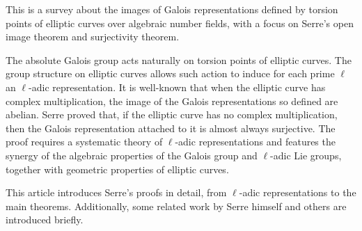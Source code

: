 This is a survey about the images of Galois representations defined by torsion points of elliptic curves over algebraic number fields, with a focus on Serre’s open image theorem and surjectivity theorem.

The absolute Galois group acts naturally on torsion points of elliptic curves. The group structure on elliptic curves allows such action to induce for each prime $\ell$ an $\ell$-adic representation.
It is well-known that when the elliptic curve has complex multiplication, the image of the Galois representations so defined are abelian.
Serre proved that, if the elliptic curve has no complex multiplication, then the Galois representation attached to it is almost always surjective.
The proof requires a systematic theory of $\ell$-adic representations and features the synergy of the algebraic properties of the Galois group and $\ell$-adic Lie groups, together with geometric properties of elliptic curves.

This article introduces Serre’s proofs in detail, from $\ell$-adic representations to the main theorems. Additionally, some related work by Serre himself and others are introduced briefly.
